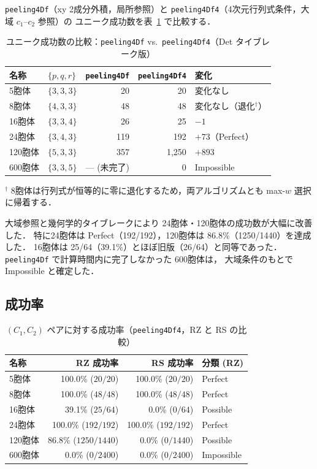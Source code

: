 \documentclass[12pt,a4paper]{article}
\theoremstyle{definition}
\begin{document}
\texttt{peeling4Df}（xy 2成分外積，局所参照）と
\texttt{peeling4Df4}（4次元行列式条件，大域 $c_1$--$c_2$ 参照）の
ユニーク成功数を表~\ref{tab:res4dcomp} で比較する．

\begin{table}[h]
\centering
\caption{ユニーク成功数の比較：\texttt{peeling4Df} vs.\ \texttt{peeling4Df4}（Det タイブレーク版）}
\label{tab:res4dcomp}
\begin{tabular}{llrrl}
\toprule
名称 & $\{p,q,r\}$ & \texttt{peeling4Df} & \texttt{peeling4Df4} & 変化 \\
\midrule
5胞体   & $\{3,3,3\}$ &   20 &       20 & 変化なし \\
8胞体   & $\{4,3,3\}$ &   48 &       48 & 変化なし（退化$^\dagger$） \\
16胞体  & $\{3,3,4\}$ &   26 &       25 & $-1$ \\
24胞体  & $\{3,4,3\}$ &  119 &      192 & $+73$（Perfect） \\
120胞体 & $\{5,3,3\}$ &  357 & 1{,}250 & $+893$ \\
600胞体 & $\{3,3,5\}$ & --- (未完了) &        0 & Impossible \\
\bottomrule
\end{tabular}
\end{table}

\noindent
$^\dagger$ 8胞体は行列式が恒等的に零に退化するため，両アルゴリズムとも
max-$w$ 選択に帰着する．

大域参照と幾何学的タイブレークにより 24胞体・120胞体の成功数が大幅に改善した．
特に24胞体は Perfect（192/192），120胞体は 86.8\%（1250/1440）を達成した．
16胞体は 25/64（39.1\%）とほぼ旧版（26/64）と同等であった．
\texttt{peeling4Df} で計算時間内に完了しなかった 600胞体は，
大域条件のもとで Impossible と確定した．

\subsection{成功率}
\label{ssec:successrates}

\begin{table}[h]
\centering
\caption{$(C_1, C_2)$ ペアに対する成功率（\texttt{peeling4Df4}，RZ と RS の比較）}
\label{tab:successrate}
\begin{tabular}{lrrl}
\toprule
名称 & RZ 成功率 & RS 成功率 & 分類 (RZ) \\
\midrule
5胞体   & 100.0\% ($20/20$)     & 100.0\% ($20/20$)   & Perfect    \\
8胞体   & 100.0\% ($48/48$)     & 100.0\% ($48/48$)   & Perfect    \\
16胞体  &  39.1\% ($25/64$)     &   0.0\% ($0/64$)    & Possible   \\
24胞体  & 100.0\% ($192/192$)   & 100.0\% ($192/192$) & Perfect    \\
120胞体 &  86.8\% ($1250/1440$) &   0.0\% ($0/1440$)  & Possible   \\
600胞体 &   0.0\% ($0/2400$)    &   0.0\% ($0/2400$)  & Impossible \\
\bottomrule
\end{tabular}
\end{table}
\end{document}
